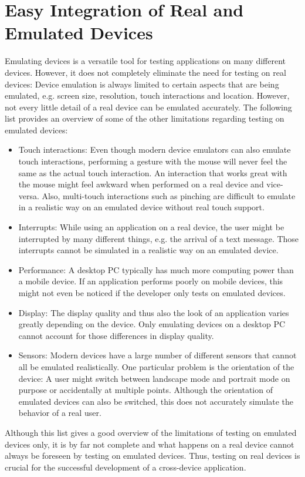 \section{Easy Integration of Real and Emulated Devices}

Emulating devices is a versatile tool for testing applications on many different devices. However, it does not completely eliminate the need for testing on real devices: Device emulation is always limited to certain aspects that are being emulated, e.g. screen size, resolution, touch interactions and location. However, not every little detail of a real device can be emulated accurately. The following list provides an overview of some of the other limitations regarding testing on emulated devices:
\begin{itemize}
	\item Touch interactions: Even though modern device emulators can also emulate touch interactions, performing a gesture with the mouse will never feel the same as the actual touch interaction. An interaction that works great with the mouse might feel awkward when performed on a real device and vice-versa. Also, multi-touch interactions such as pinching are difficult to emulate in a realistic way on an emulated device without real touch support.
	\item Interrupts: While using an application on a real device, the user might be interrupted by many different things, e.g. the arrival of a text message. Those interrupts cannot be simulated in a realistic way on an emulated device.
	\item Performance: A desktop PC typically has much more computing power than a mobile device. If an application performs poorly on mobile devices, this might not even be noticed if the developer only tests on emulated devices.
	\item Display: The display quality and thus also the look of an application varies greatly depending on the device. Only emulating devices on a desktop PC cannot account for those differences in display quality. 
	\item Sensors: Modern devices have a large number of different sensors that cannot all be emulated realistically. One particular problem is the orientation of the device: A user might switch between landscape mode and portrait mode on purpose or accidentally at multiple points. Although the orientation of emulated devices can also be switched, this does not accurately simulate the behavior of a real user.
\end{itemize}
Although this list gives a good overview of the limitations of testing on emulated devices only, it is by far not complete and what happens on a real device cannot always be foreseen by testing on emulated devices. Thus, testing on real devices is crucial for the successful development of a cross-device application. 

